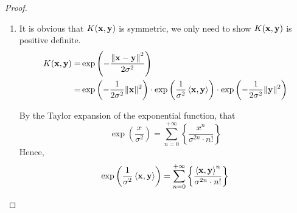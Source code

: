 \begin{proof}
	\begin{enumerate}
		\item It is obvious that $K({\bf x},\mathbf{y})$ is symmetric, we only need to show $K({\bf x},\mathbf{y})$ is positive definite.
		      \begin{equation*}
			      \begin{aligned}
				      K({\bf x},\mathbf{y})= & \exp\left(-\frac{\left\|{\bf x}-\mathbf{y}\right\|^{2}}{2\sigma^{2}}\right)                                                                                                                            \\
				      =                   & \exp\left(-\frac{1}{2\sigma^{2}}\|{\bf x}\|^{2}\right)\cdot\exp\left(\frac{1}{\sigma^{2}}\left\langle{\bf x},\mathbf{y}\right\rangle\right)\cdot\exp\left(-\frac{1}{2\sigma^{2}}\|\mathbf{y}\|^{2}\right)
			      \end{aligned}
		      \end{equation*}

		      By the Taylor expansion of the exponential function, that
		      \begin{equation*}
			      \exp\left(\frac{x}{\sigma^{2}}\right)=\sum_{n=0}^{+\infty}\left\{\frac{x^{n}}{\sigma^{2n}\cdot n!}\right\}
		      \end{equation*}
		      Hence,
		      \begin{equation*}
			      \exp\left(\frac{1}{\sigma^{2}}\left\langle{\bf x},\mathbf{y}\right\rangle\right)=\sum_{n=0}^{+\infty}\left\{\frac{\left\langle{\bf x},\mathbf{y}\right\rangle^{n}}{\sigma^{2n}\cdot n!}\right\}
		      \end{equation*}


\end{enumerate}
\end{proof}
